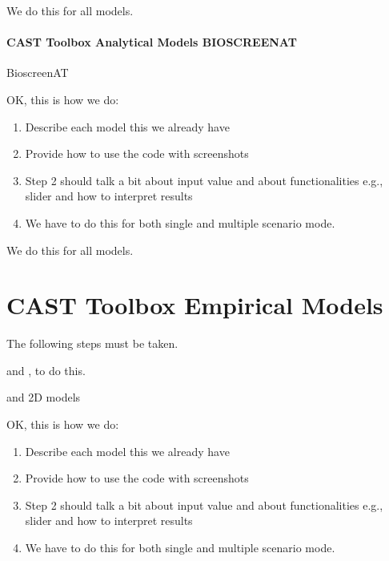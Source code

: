 \documentclass[letterpaper,10pt,english]{sphinxmanual}
\begin{document}
\sphinxAtStartPar
We do this for all models.


\subsubsection{CAST Toolbox \sphinxhyphen{} Analytical Models \sphinxhyphen{} BIOSCREEN\sphinxhyphen{}AT}
\label{\detokenize{contents/toolbox/an_model/bioscreen:cast-toolbox-analytical-models-bioscreen-at}}\label{\detokenize{contents/toolbox/an_model/bioscreen::doc}}
\sphinxAtStartPar
{} Bioscreen\sphinxhyphen{}AT

\sphinxAtStartPar
OK, this is how we do:
\begin{enumerate}
%
\item {} 
\sphinxAtStartPar
Describe each model \sphinxhyphen{} this we already have

\item {} 
\sphinxAtStartPar
Provide how to use the code with screenshots

\item {} 
\sphinxAtStartPar
Step 2 should talk a bit about input value and about functionalities \sphinxhyphen{} e.g., slider and how to interpret results

\item {} 
\sphinxAtStartPar
We have to do this for both single and multiple scenario mode.

\end{enumerate}

\sphinxAtStartPar
We do this for all models.


\chapter{CAST Toolbox \sphinxhyphen{} Empirical Models}
\label{\detokenize{contents/toolbox/em_model/em_model:cast-toolbox-empirical-models}}\label{\detokenize{contents/toolbox/em_model/em_model::doc}}
\sphinxAtStartPar
The following steps must be taken.

\sphinxAtStartPar
{} and , to do this.

\sphinxAtStartPar
{} and  \sphinxhyphen{} 2D models

\sphinxAtStartPar
OK, this is how we do:
\begin{enumerate}
%
\item {} 
\sphinxAtStartPar
Describe each model \sphinxhyphen{} this we already have

\item {} 
\sphinxAtStartPar
Provide how to use the code with screenshots

\item {} 
\sphinxAtStartPar
Step 2 should talk a bit about input value and about functionalities \sphinxhyphen{} e.g., slider and how to interpret results

\item {} 
\sphinxAtStartPar
We have to do this for both single and multiple scenario mode.

\end{enumerate}
\end{document}
